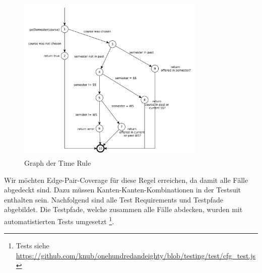 \documentclass[ngerman]{article}
\begin{document}
\begin{figure}[h!]
\includegraphics[width=0.8\textwidth]{figures/time_rule.pdf}
\caption{Graph der Time Rule}
\label{Fig:graph_time_rule}
\end{figure}

Wir möchten Edge-Pair-Coverage für diese Regel erreichen, da damit alle Fälle abgedeckt sind.
Dazu müssen Kanten-Kanten-Kombinationen in der Testsuit enthalten sein.
Nachfolgend sind alle Test Requirements und Testpfade abgebildet. Die Testpfade, welche zusammen alle Fälle abdecken, wurden mit automatistierten Tests umgesetzt \footnote{Tests siehe \url{https://github.com/knub/onehundredandeighty/blob/testing/test/cfg_test.js}}.


\vspace{1em}
\end{document}

